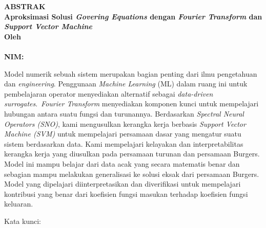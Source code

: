 \clearpage
{}
\begin{center}
\textbf{\large  ABSTRAK}\\[0.5cm]
\textbf{\large Aproksimasi Solusi \textit{Govering Equations} dengan \emph{Fourier Transform} dan \textit{Support Vector Machine}}\\[0.5cm]
\textbf{Oleh}\\
\textbf{\penulis}\\
\textbf{NIM:\@\nim}\\[2em]
\end{center}

\noindent Model numerik sebuah sistem merupakan bagian penting dari ilmu pengetahuan dan \textit{engineering}. Penggunaan \textit{Machine Learning} (ML) dalam ruang ini untuk pembelajaran operator menyediakan alternatif sebagai \textit{data-driven surrogates}.\ \textit{Fourier Transform} menyediakan komponen kunci untuk mempelajari hubungan antara suatu fungsi dan turunannya. Berdasarkan \textit{Spectral Neural Operators (SNO)}, kami mengusulkan kerangka kerja berbasis \textit{Support Vector Machine (SVM)} untuk mempelajari persamaan dasar yang mengatur suatu sistem berdasarkan data. Kami mempelajari kelayakan dan interpretabilitas kerangka kerja yang diusulkan pada persamaan turunan dan persamaan Burgers. Model ini mampu belajar dari data acak yang secara matematis benar dan sebagian mampu melakukan generalisasi ke solusi eksak dari persamaan Burgers. Model yang dipelajari diinterpretasikan dan diverifikasi untuk mempelajari kontribusi yang benar dari koefisien fungsi masukan terhadap koefisien fungsi keluaran.




\noindent Kata kunci: \katakunci{}
